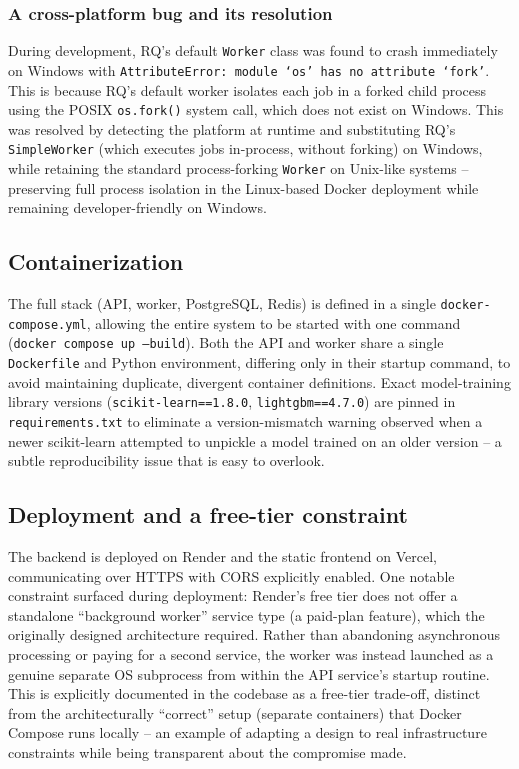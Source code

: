 \documentclass[11pt]{article}
\begin{document}
\subsubsection{A cross-platform bug and its resolution}
During development, RQ's default \texttt{Worker} class was found to crash
immediately on Windows with \texttt{AttributeError: module `os' has no
attribute `fork'}. This is because RQ's default worker isolates each job
in a forked child process using the POSIX \texttt{os.fork()} system call,
which does not exist on Windows. This was resolved by detecting the
platform at runtime and substituting RQ's \texttt{SimpleWorker} (which
executes jobs in-process, without forking) on Windows, while retaining the
standard process-forking \texttt{Worker} on Unix-like systems -- preserving
full process isolation in the Linux-based Docker deployment while
remaining developer-friendly on Windows.

\subsection{Containerization}
The full stack (API, worker, PostgreSQL, Redis) is defined in a single
\texttt{docker-compose.yml}, allowing the entire system to be started
with one command (\texttt{docker compose up --build}). Both the API and
worker share a single \texttt{Dockerfile} and Python environment, differing
only in their startup command, to avoid maintaining duplicate, divergent
container definitions. Exact model-training library versions
(\texttt{scikit-learn==1.8.0}, \texttt{lightgbm==4.7.0}) are pinned in
\texttt{requirements.txt} to eliminate a version-mismatch warning observed
when a newer scikit-learn attempted to unpickle a model trained on an
older version -- a subtle reproducibility issue that is easy to overlook.

\subsection{Deployment and a free-tier constraint}
The backend is deployed on Render and the static frontend on Vercel,
communicating over HTTPS with CORS explicitly enabled. One notable
constraint surfaced during deployment: Render's free tier does not offer
a standalone ``background worker'' service type (a paid-plan feature),
which the originally designed architecture required. Rather than
abandoning asynchronous processing or paying for a second service, the
worker was instead launched as a genuine separate OS subprocess from
within the API service's startup routine. This is explicitly documented
in the codebase as a free-tier trade-off, distinct from the architecturally
``correct'' setup (separate containers) that Docker Compose runs locally --
an example of adapting a design to real infrastructure constraints while
being transparent about the compromise made.
\end{document}
